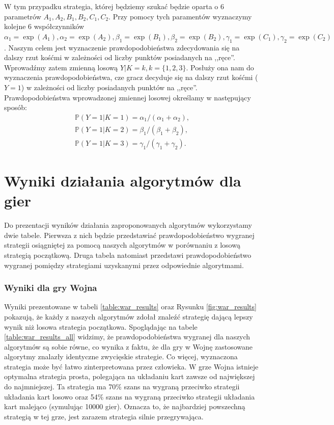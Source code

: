 \documentclass[inzynierska]{pwr_wmat_praca_dyplomowa}
\theoremstyle{plain}
\numberwithin{theorem}{chapter}
\theoremstyle{definition}
\numberwithin{theorem}{chapter}
\newcommand{\probP}{\mathbb{P}}
\begin{document}
	W tym przypadku strategia, której będziemy szukać będzie oparta o 6 parametrów $A_1, A_2, B_1, B_2, C_1, C_2$. Przy pomocy tych paramentów wyznaczymy kolejne 6 współczynników 
	$
	\alpha_1 = \exp(A_1),
	\alpha_2 = \exp(A_2), 
	\beta_1= \exp(B_1), 
	\beta_2= \exp(B_2), 
	\gamma_1= \exp(C_1), 
	\gamma_2= \exp(C_2)$. 
	Naszym celem jest wyznaczenie prawdopodobieństwa zdecydowania się na dalszy rzut kośćmi w zależności od liczby punktów posiadanych na ,,ręce''. Wprowadźmy zatem  zmienną losową $Y|K=k, k=\{1, 2, 3\}$. Posłuży ona  nam do wyznaczenia prawdopodobieństwa, cze gracz decyduje się na dalszy rzut kośćmi ($Y=1$) w zależności od liczby posiadanych punktów na ,,ręce''.  Prawdopodobieństwa wprowadzonej zmiennej losowej określamy w następujący sposób:  
	\begin{gather*}
	 \probP(Y = 1|K=1) = \alpha_1/(\alpha_1+\alpha_2),\\
	 \probP(Y = 1|K=2) = \beta_1/(\beta_1+\beta_2),\\
	 \probP(Y = 1|K=3) = \gamma_1/(\gamma_1+\gamma_2). 
	\end{gather*}


	
	\chapter{Wyniki działania algorytmów dla gier}
	Do prezentacji wyników działania zaproponowanych algorytmów wykorzystamy dwie tabele.
	Pierwsza z nich będzie przedstawiać prawdopodobieństwo wygranej strategii osiągniętej za pomocą naszych algorytmów w porównaniu z losową strategią początkową.
	Druga tabela natomiast przedstawi prawdopodobieństwo wygranej pomiędzy strategiami uzyskanymi przez odpowiednie algorytmami.
	
	\subsection*{Wyniki dla gry Wojna}
	Wyniki prezentowane w tabeli \ref{table:war_results} oraz Rysunku \ref{fig:war_results} pokazują, że każdy z naszych algorytmów zdołał znaleźć strategię dającą lepszy wynik niż losowa strategia początkowa. Spoglądając na tabele \ref{table:war_results_all} widzimy, że prawdopodobieństwa wygranej dla naszych algorytmów są sobie równe, co wynika z faktu, że dla gry w Wojnę zastosowane algorytmy znalazły identyczne zwycięskie strategie. Co więcej, wyznaczona strategia może być łatwo zinterpretowana przez człowieka. W grze Wojna istnieje optymalna strategia prosta, polegająca na układaniu kart zawsze od największej do najmniejszej. Ta strategia ma 70\% szans na wygraną przeciwko strategii układania kart losowo oraz 54\% szans na wygraną przeciwko strategii układania kart malejąco (symulując 10000 gier). Oznacza to, że najbardziej powszechną strategią w tej grze, jest zarazem strategia silnie przegrywająca.
	
\end{document}
